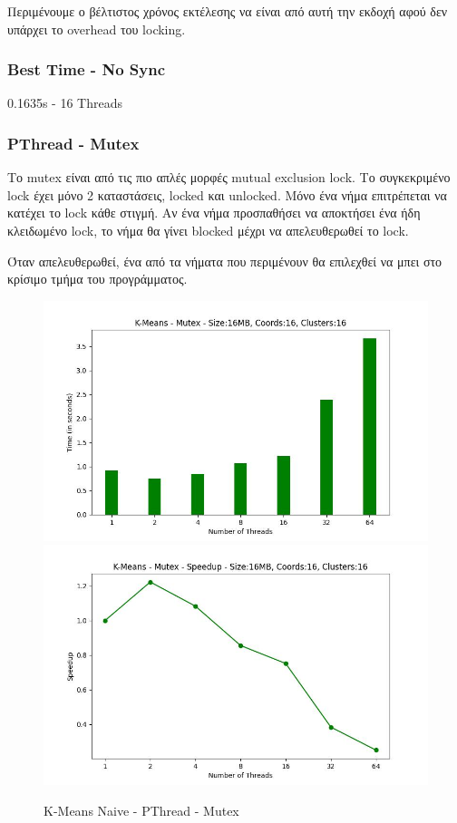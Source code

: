 \documentclass[../final_report.tex]{subfiles}
\begin{document}
Περιμένουμε ο βέλτιστος χρόνος εκτέλεσης να είναι από αυτή την εκδοχή αφού δεν υπάρχει το overhead
του locking.

\subsubsection*{Best Time - No Sync}
0.1635s - 16 Threads

\subsubsection{PThread - Mutex}

Το mutex είναι από τις πιο απλές μορφές mutual exclusion lock. Το συγκεκριμένο lock έχει μόνο 2 καταστάσεις,
locked και unlocked. Μόνο ένα νήμα επιτρέπεται να κατέχει το lock κάθε στιγμή. Αν ένα νήμα προσπαθήσει να 
αποκτήσει ένα ήδη κλειδωμένο lock, το νήμα θα γίνει blocked μέχρι να απελευθερωθεί το lock.

Όταν απελευθερωθεί, ένα από τα νήματα που περιμένουν θα επιλεχθεί να μπει στο κρίσιμο τμήμα του
προγράμματος.

\begin{figure}[H]
    \centering
        \includegraphics[scale=0.4]{outFiles/plots/kmeans_locks_pthread_mutex.jpg}
        \includegraphics[scale=0.4]{outFiles/plots/kmeans_locks_pthread_mutex_speedup.jpg}
    \caption{K-Means Naive - PThread - Mutex}
    \label{fig:K-Means Naive - PThread - Mutex}
\end{figure}
\end{document}
